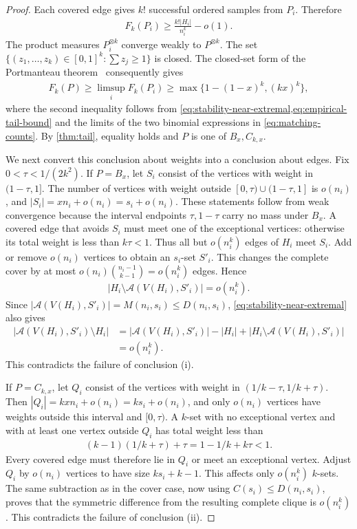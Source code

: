 \begin{proof}
Each covered edge gives $k!$ successful ordered samples from $P_i$. Therefore
\begin{align}
F_k(P_i)\ge\frac{k!|H_i|}{n_i^k}-o(1).
\label{eq:empirical-tail-bound}
\end{align}
The product measures $P_i^{\otimes k}$ converge weakly to $P^{\otimes k}$. The set $\{(z_1,\ldots,z_k)\in[0,1]^k\colon\sum z_j\ge1\}$ is closed. The closed-set form of the Portmanteau theorem~\cite{Billingsley1999} consequently gives
\begin{align*}
F_k(P)\ge\limsup_iF_k(P_i)
\ge\max\{1-(1-x)^k,(kx)^k\},
\end{align*}
where the second inequality follows from \cref{eq:stability-near-extremal,eq:empirical-tail-bound} and the limits of the two binomial expressions in \cref{eq:matching-counts}. By \cref{thm:tail}, equality holds and $P$ is one of $B_x,C_{k,x}$.

We next convert this conclusion about weights into a conclusion about edges. Fix $0<\tau<1/(2k^2)$. If $P=B_x$, let $S_i$ consist of the vertices with weight in $(1-\tau,1]$. The number of vertices with weight outside $[0,\tau)\cup(1-\tau,1]$ is $o(n_i)$, and $|S_i|=xn_i+o(n_i)=s_i+o(n_i)$. These statements follow from weak convergence because the interval endpoints $\tau,1-\tau$ carry no mass under $B_x$. A covered edge that avoids $S_i$ must meet one of the exceptional vertices: otherwise its total weight is less than $k\tau<1$. Thus all but $o(n_i^k)$ edges of $H_i$ meet $S_i$. Add or remove $o(n_i)$ vertices to obtain an $s_i$-set $S'_i$. This changes the complete cover by at most $o(n_i)\binom{n_i-1}{k-1}=o(n_i^k)$ edges. Hence
\begin{align*}
|H_i\setminus\mathcal A(V(H_i),S'_i)|=o(n_i^k).
\end{align*}
Since $|\mathcal A(V(H_i),S'_i)|=M(n_i,s_i)\le D(n_i,s_i)$, \cref{eq:stability-near-extremal} also gives
\begin{align*}
|\mathcal A(V(H_i),S'_i)\setminus H_i|
&=|\mathcal A(V(H_i),S'_i)|-|H_i|+|H_i\setminus\mathcal A(V(H_i),S'_i)|\\
&=o(n_i^k).
\end{align*}
This contradicts the failure of conclusion (i).

If $P=C_{k,x}$, let $Q_i$ consist of the vertices with weight in $(1/k-\tau,1/k+\tau)$. Then $|Q_i|=kxn_i+o(n_i)=ks_i+o(n_i)$, and only $o(n_i)$ vertices have weights outside this interval and $[0,\tau)$. A $k$-set with no exceptional vertex and with at least one vertex outside $Q_i$ has total weight less than
\begin{align*}
(k-1)(1/k+\tau)+\tau=1-1/k+k\tau<1.
\end{align*}
Every covered edge must therefore lie in $Q_i$ or meet an exceptional vertex. Adjust $Q_i$ by $o(n_i)$ vertices to have size $ks_i+k-1$. This affects only $o(n_i^k)$ $k$-sets. The same subtraction as in the cover case, now using $C(s_i)\le D(n_i,s_i)$, proves that the symmetric difference from the resulting complete clique is $o(n_i^k)$. This contradicts the failure of conclusion (ii).
\end{proof}

